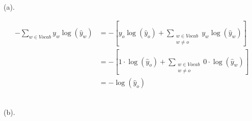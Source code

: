 \documentclass{article}
\begin{document}
(a). 

\begin{equation*}
  \begin{aligned}
  -\sum_{w \in Vocab} y_{w} \log \left(\hat{y}_{w}\right)& = - \left[ y_{o} \log \left(\hat{y}_{o}\right) + \sum_{\substack{w \in Vocab \\ w \neq o}} y_{w} \log \left(\hat{y}_{w}\right) \right] \\
  & = - \left[ 1 \cdot \log \left(\hat{y}_{o}\right) + \sum_{\substack{w \in Vocab \\ w \neq o}} 0 \cdot \log \left(\hat{y}_{w}\right) \right] \\
  & = - \log \left( \hat{y}_{o} \right) 
  \end{aligned} 
\end{equation*}

~\\

(b). 
\end{document}
